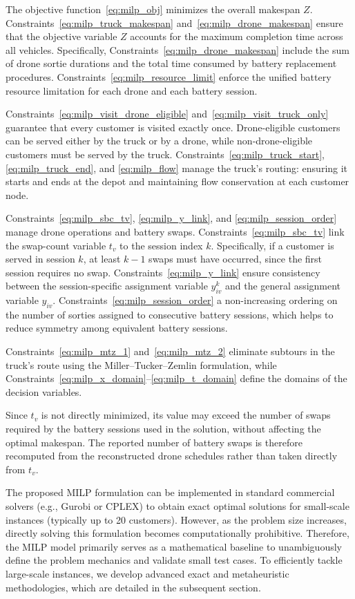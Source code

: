 \documentclass[3p, authoryear, 11pt]{elsarticle}
\begin{document}
The objective function~\eqref{eq:milp_obj} minimizes the overall makespan \(Z\). Constraints~\eqref{eq:milp_truck_makespan} and~\eqref{eq:milp_drone_makespan} ensure that the objective variable \(Z\) accounts for the maximum completion time across all vehicles. Specifically, Constraints~\eqref{eq:milp_drone_makespan} include the sum of drone sortie durations and the total time consumed by battery replacement procedures. Constraints~\eqref{eq:milp_resource_limit} enforce the unified battery resource limitation for each drone and each battery session. 

Constraints~\eqref{eq:milp_visit_drone_eligible} and~\eqref{eq:milp_visit_truck_only} guarantee that every customer is visited exactly once. Drone-eligible customers can be served either by the truck or by a drone, while non-drone-eligible customers must be served by the truck.
Constraints~\eqref{eq:milp_truck_start}, \eqref{eq:milp_truck_end}, and \eqref{eq:milp_flow} manage the truck's routing: ensuring it starts and ends at the depot and maintaining flow conservation at each customer node.

Constraints~\eqref{eq:milp_sbc_tv}, \eqref{eq:milp_y_link}, and \eqref{eq:milp_session_order} manage drone operations and battery swaps. Constraints~\eqref{eq:milp_sbc_tv} link the swap-count variable \(t_v\) to the session index \(k\). Specifically, if a customer is served in session \(k\), at least \(k-1\) swaps must have occurred, since the first session requires no swap. Constraints~\eqref{eq:milp_y_link} ensure consistency between the session-specific assignment variable \(y^k_{iv}\) and the general assignment variable \(y_{iv}\). Constraints~\eqref{eq:milp_session_order} a non-increasing ordering on the number of sorties assigned to consecutive battery sessions, which helps to reduce symmetry among equivalent battery sessions.

Constraints~\eqref{eq:milp_mtz_1} and~\eqref{eq:milp_mtz_2} eliminate subtours in the truck's route using the Miller--Tucker--Zemlin formulation, while Constraints~\eqref{eq:milp_x_domain}--\eqref{eq:milp_t_domain} define the domains of the decision variables.

Since \(t_v\) is not directly minimized, its value may exceed
the number of swaps required by the battery sessions used in
the solution, without affecting the optimal makespan.
The reported number of battery swaps is therefore recomputed
from the reconstructed drone schedules rather than taken
directly from \(t_v\).

The proposed MILP formulation can be implemented in standard commercial solvers (e.g., Gurobi or CPLEX) to obtain exact optimal solutions for small-scale instances (typically up to 20 customers). However, as the problem size increases, directly solving this formulation becomes computationally prohibitive. Therefore, the MILP model primarily serves as a mathematical baseline to unambiguously define the problem mechanics and validate small test cases. To efficiently tackle large-scale instances, we develop advanced exact and metaheuristic methodologies, which are detailed in the subsequent section.
\end{document}
